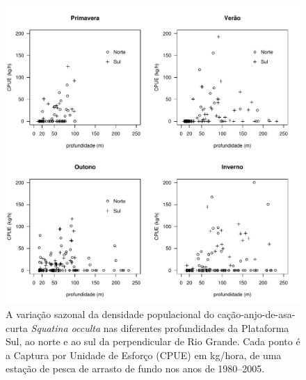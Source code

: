 \documentclass[a4paper,11pt,twoside,showtrims,onecolumn,openright,final]{memoir}
\begin{document}
\begin{figure}
\begin{center}
\includegraphics[width=\textwidth]{Occulta_CPUExProfTrimestres}
\end{center}
\caption[Variação sazonal da densidade populacional do cação-anjo-de-asa-curta \emph{Squatina occulta}]
	{A variação sazonal da densidade populacional do cação-anjo-de-asa-curta \emph{Squatina occulta} 
	 nas diferentes profundidades da Plataforma Sul, ao norte e ao sul da perpendicular de Rio Grande. 
	 Cada ponto é a Captura por Unidade de Esforço (CPUE) em kg/hora, de uma 
	 estação de pesca de arrasto de fundo nos anos de  1980--2005.}
\label{fig:occulta-cpueportrimestre}
\end{figure}


%
%
\end{document}
